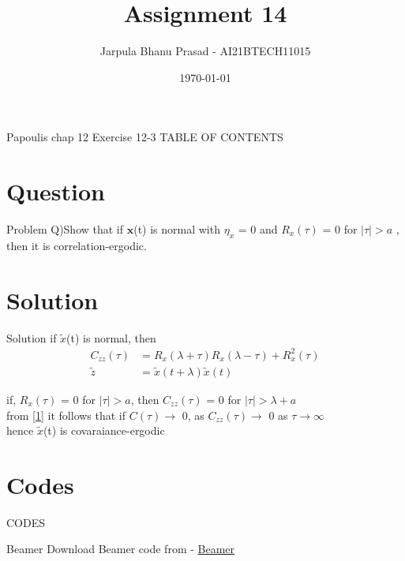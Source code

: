 \documentclass{beamer}
\title{Assignment 14}
\author{Jarpula Bhanu Prasad - AI21BTECH11015}
\date{\today}
\begin{document}
\begin{frame}
    \titlepage 
\end{frame}

\logo{}


\begin{frame}{Papoulis chap 12 Exercise 12-3}
TABLE OF CONTENTS
    \tableofcontents
\end{frame}


\section{Question}
\begin{frame}{Problem}
Q)Show that if $\textbf{x}$(t) is normal with $\eta_x$ = 0 and $R_x(\tau)$ = 0 for $|\tau| > a$ , then it is correlation-ergodic.
\end{frame}

\section{Solution}
\begin{frame}{Solution}
    if $\tilde{x}$(t) is normal, then 
    \begin{align} \label{1}
        C_{zz}(\tau) &= R_x(\lambda + \tau)R_x(\lambda - \tau) + R_x^2(\tau) \\
        \tilde{z} &= \tilde{x}(t + \lambda)\tilde{x}(t)
    \end{align}

    if, $R_x(\tau)$ = 0 for $|\tau| > a$, then $C_{zz}(\tau)$ = 0 for $|\tau| > \lambda + a$\\

    from \eqref{1} it follows that if $C(\tau) \rightarrow$ 0, as $C_{zz}(\tau) \rightarrow$ 0 as $\tau \rightarrow \infty$\\
    hence $\tilde{x}$(t) is covaraiance-ergodic
   
\end{frame}

\section{Codes}
\begin{frame}{CODES}

 \begin{block}{Beamer}
         Download Beamer code from - \href{https://github.com/jarpula-Bhanu/Assignment-14/blob/main/Assignment_14.tex}{Beamer}
    \end{block}
\end{frame} 
\end{document}
